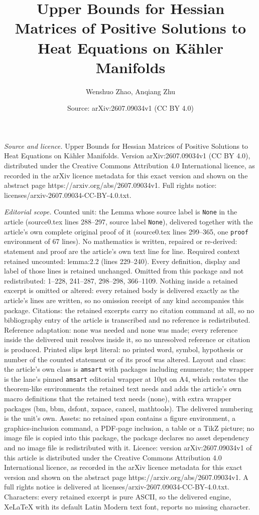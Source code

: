 \documentclass[10pt,a4paper]{amsart}
\title[Upper Bounds for Hessian Matrices of Positive Solutions to H]{Upper Bounds for Hessian Matrices of Positive Solutions to Heat Equations on K\"ahler Manifolds}
\author{Wenshuo Zhao, Anqiang Zhu}
\date{Source: arXiv:2607.09034v1 (CC BY 4.0)}
\begin{document}
\maketitle

\noindent\emph{Source and licence.} Upper Bounds for Hessian Matrices of Positive Solutions to Heat Equations on K\"ahler Manifolds. Version arXiv:2607.09034v1 (CC BY 4.0), distributed under the Creative Commons Attribution 4.0 International licence, as recorded in the arXiv licence metadata for this exact version and shown on the abstract page https://arxiv.org/abs/2607.09034v1. Full rights notice: licenses/arxiv-2607.09034-CC-BY-4.0.txt.\par\smallskip

\noindent\textit{Editorial scope.} Counted unit: the Lemma whose source label is \texttt{None} in the article (source0.tex lines 288--297, source label \texttt{None}), delivered together with the article's own complete original proof of it (source0.tex lines 299--365, one \texttt{proof} environment of 67 lines). No mathematics is written, repaired or re-derived: statement and proof are the article's own text line for line. Required context retained uncounted: lemma:2.2 (lines 229--240). Every definition, display and label of those lines is retained unchanged. Omitted from this package and not redistributed: 1--228, 241--287, 298--298, 366--1109. Nothing inside a retained excerpt is omitted or altered: every retained body is delivered exactly as the article's lines are written, so no omission receipt of any kind accompanies this package. Citations: the retained excerpts carry no citation command at all, so no bibliography entry of the article is transcribed and no reference is redistributed. Reference adaptation: none was needed and none was made; every reference inside the delivered unit resolves inside it, so no unresolved reference or citation is produced. Printed slips kept literal: no printed word, symbol, hypothesis or number of the counted statement or of its proof was altered. Layout and class: the article's own class is \texttt{amsart} with packages including enumerate; the wrapper is the lane's pinned \texttt{amsart} editorial wrapper at 10pt on A4, which restates the theorem-like environments the retained text needs and adds the article's own macro definitions that the retained text needs (none), with extra wrapper packages (bm, bbm, dsfont, xspace, cancel, mathtools). The delivered numbering is the unit's own. Assets: no retained span contains a figure environment, a graphics-inclusion command, a PDF-page inclusion, a table or a TikZ picture; no image file is copied into this package, the package declares no asset dependency and no image file is redistributed with it. Licence: version arXiv:2607.09034v1 of this article is distributed under the Creative Commons Attribution 4.0 International licence, as recorded in the arXiv licence metadata for this exact version and shown on the abstract page https://arxiv.org/abs/2607.09034v1. A full rights notice is delivered at licenses/arxiv-2607.09034-CC-BY-4.0.txt. Characters: every retained excerpt is pure ASCII, so the delivered engine, XeLaTeX with its default Latin Modern text font, reports no missing character.
\end{document}
